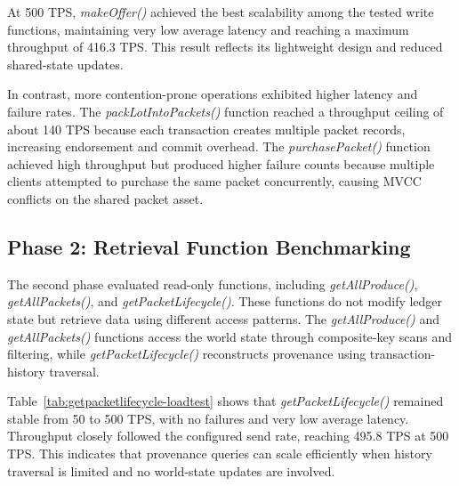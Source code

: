 \documentclass[manuscript,screen,nofonts]{acmart}
\begin{document}
At 500 TPS, \textit{makeOffer()} achieved the best scalability among the tested write functions, maintaining very low average latency and reaching a maximum throughput of 416.3 TPS. This result reflects its lightweight design and reduced shared-state updates.

In contrast, more contention-prone operations exhibited higher latency and failure rates. The \textit{packLotIntoPackets()} function reached a throughput ceiling of about 140 TPS because each transaction creates multiple packet records, increasing endorsement and commit overhead. The \textit{purchasePacket()} function achieved high throughput but produced higher failure counts because multiple clients attempted to purchase the same packet concurrently, causing MVCC conflicts on the shared packet asset.

\subsection{Phase 2: Retrieval Function Benchmarking}

The second phase evaluated read-only functions, including \textit{getAllProduce()}, \textit{getAllPackets()}, and \textit{getPacketLifecycle()}. These functions do not modify ledger state but retrieve data using different access patterns. The \textit{getAllProduce()} and \textit{getAllPackets()} functions access the world state through composite-key scans and filtering, while \textit{getPacketLifecycle()} reconstructs provenance using transaction-history traversal.

Table~\ref{tab:getpacketlifecycle-loadtest} shows that \textit{getPacketLifecycle()} remained stable from 50 to 500 TPS, with no failures and very low average latency. Throughput closely followed the configured send rate, reaching 495.8 TPS at 500 TPS. This indicates that provenance queries can scale efficiently when history traversal is limited and no world-state updates are involved.
\end{document}
